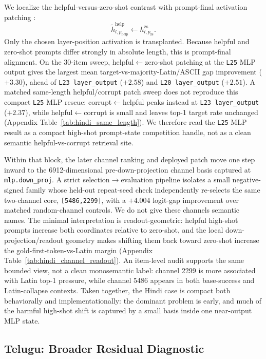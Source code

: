 \documentclass{article}
\begin{document}
We localize the helpful-versus-zero-shot contrast with prompt-final activation patching \citep{patchingbest, rome}:
\begin{equation}
\tilde{h}^{\mathrm{help}}_{l,p_{\mathrm{help}}} \leftarrow h^{\mathrm{zs}}_{l,p_{\mathrm{zs}}}.
\end{equation}
Only the chosen layer-position activation is transplanted. Because helpful and zero-shot prompts differ strongly in absolute length, this is prompt-final alignment. On the 30-item sweep, helpful$\leftarrow$zero-shot patching at the \texttt{L25} MLP output gives the largest mean target-vs-majority-Latin/ASCII gap improvement ($+3.30$), ahead of \texttt{L23 layer\_output} ($+2.58$) and \texttt{L20 layer\_output} ($+2.51$). A matched same-length helpful/corrupt patch sweep does not reproduce this compact \texttt{L25} MLP rescue: corrupt$\leftarrow$helpful peaks instead at \texttt{L23 layer\_output} ($+2.37$), while helpful$\leftarrow$corrupt is small and leaves top-1 target rate unchanged (Appendix Table~\ref{tab:hindi_same_length}). We therefore read the \texttt{L25} MLP result as a compact high-shot prompt-state competition handle, not as a clean semantic helpful-vs-corrupt retrieval site.

Within that block, the later channel ranking and deployed patch move one step inward to the 6912-dimensional pre-down-projection channel basis captured at \texttt{mlp.down\_proj}. A strict selection$\to$evaluation pipeline isolates a small negative-signed family whose held-out repeat-seed check independently re-selects the same two-channel core, \texttt{[5486,2299]}, with a $+4.004$ logit-gap improvement over matched random-channel controls. We do not give these channels semantic names. The minimal interpretation is readout-geometric: helpful high-shot prompts increase both coordinates relative to zero-shot, and the local down-projection/readout geometry makes shifting them back toward zero-shot increase the gold-first-token-vs-Latin margin (Appendix Table~\ref{tab:hindi_channel_readout}). An item-level audit supports the same bounded view, not a clean monosemantic label: channel 2299 is more associated with Latin top-1 pressure, while channel 5486 appears in both base-success and Latin-collapse contexts. Taken together, the Hindi case is compact both behaviorally and implementationally: the dominant problem is early, and much of the harmful high-shot shift is captured by a small basis inside one near-output MLP state.

\subsection{Telugu: Broader Residual Diagnostic}
\end{document}
